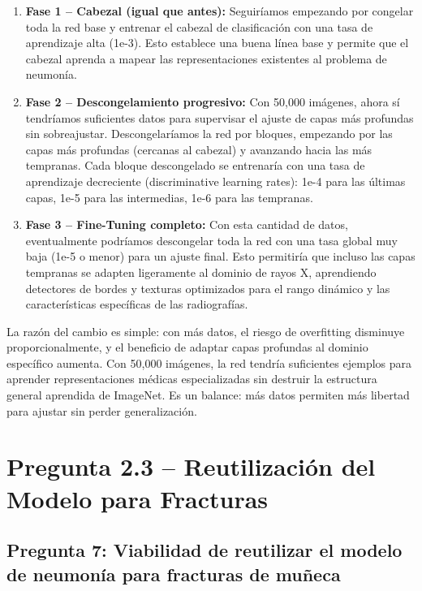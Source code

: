 \documentclass[12pt, letterpaper]{article}
\begin{document}
\begin{enumerate}[leftmargin=1.5cm]
    \item \textbf{Fase 1 -- Cabezal (igual que antes):} Seguiríamos empezando por congelar toda
    la red base y entrenar el cabezal de clasificación con una tasa de aprendizaje alta (1e-3).
    Esto establece una buena línea base y permite que el cabezal aprenda a mapear las
    representaciones existentes al problema de neumonía.

    \item \textbf{Fase 2 -- Descongelamiento progresivo:} Con 50,000 imágenes, ahora sí
    tendríamos suficientes datos para supervisar el ajuste de capas más profundas sin
    sobreajustar. Descongelaríamos la red por bloques, empezando por las capas más profundas
    (cercanas al cabezal) y avanzando hacia las más tempranas. Cada bloque descongelado se
    entrenaría con una tasa de aprendizaje decreciente (discriminative learning rates):
    1e-4 para las últimas capas, 1e-5 para las intermedias, 1e-6 para las tempranas.

    \item \textbf{Fase 3 -- Fine-Tuning completo:} Con esta cantidad de datos, eventualmente
    podríamos descongelar toda la red con una tasa global muy baja (1e-5 o menor) para un
    ajuste final. Esto permitiría que incluso las capas tempranas se adapten ligeramente al
    dominio de rayos X, aprendiendo detectores de bordes y texturas optimizados para el rango
    dinámico y las características específicas de las radiografías.
\end{enumerate}

La razón del cambio es simple: con más datos, el riesgo de overfitting disminuye
proporcionalmente, y el beneficio de adaptar capas profundas al dominio específico aumenta.
Con 50,000 imágenes, la red tendría suficientes ejemplos para aprender representaciones
médicas especializadas sin destruir la estructura general aprendida de ImageNet. Es un
balance: más datos permiten más libertad para ajustar sin perder generalización.

\section{Pregunta 2.3 -- Reutilización del Modelo para Fracturas}

\subsection{Pregunta 7: Viabilidad de reutilizar el modelo de neumonía para fracturas de muñeca}
\end{document}
